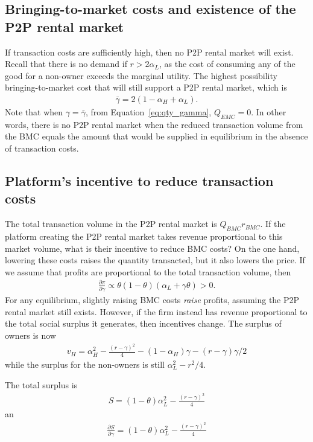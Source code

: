 \documentclass[11pt]{article}
\begin{document}
\subsection{Bringing-to-market costs and existence of the P2P rental market}
If transaction costs are sufficiently high, then no P2P rental market will exist. 
Recall that there is no demand if $r > 2 \alpha_L$, as the cost of consuming any of the good for a non-owner exceeds the marginal utility. 
The highest possibility bringing-to-market cost that will still support a P2P rental market, which is 
\begin{align} 
  \bar{\gamma} = 2(1-\alpha_H + \alpha_L). 
\end{align}
Note that when $\gamma = \bar{\gamma}$, from Equation~\ref{eq:qty_gamma}, $Q_{EMC} = 0$.
In other words, there is no P2P rental market when the reduced transaction volume from the BMC equals the amount that would be supplied in equilibrium in the absence of transaction costs. 

\subsection{Platform's incentive to reduce transaction costs}
The total transaction volume in the P2P rental market is $Q_{BMC} r_{BMC}$.
If the platform creating the P2P rental market takes revenue proportional to this market volume, what is their incentive to reduce BMC costs?
On the one hand, lowering these costs raises the quantity transacted, but it also lowers the price.
If we assume that profits are proportional to the total transaction volume, then 
\begin{align}
  \frac{\partial \pi}{\partial \gamma} \propto \theta(1-\theta)(\alpha_L + \gamma \theta) > 0. 
\end{align}
For any equilibrium, slightly raising BMC costs \emph{raise} profits, assuming the P2P rental market still exists.
However, if the firm instead has revenue proportional to the total social surplus it generates, then incentives change. 
The surplus of owners is now
\begin{align}
  v_H = \alpha_H^2 - \frac{(r-\gamma)^2}{4} - (1 - \alpha_H)\gamma - (r-\gamma)\gamma/2
\end{align}
while the surplus for the non-owners is still $\alpha_L^2 - r^2/4$. 

The total surplus is
\begin{align}
  S = (1 - \theta)\alpha_L^2 - \frac{(r - \gamma)^2}{4}
\end{align} 
an
\begin{align}
  \frac{\partial S}{\partial \gamma} = (1 - \theta)\alpha_L^2 - \frac{(r - \gamma)^2}{4}
\end{align} 
\end{document}
